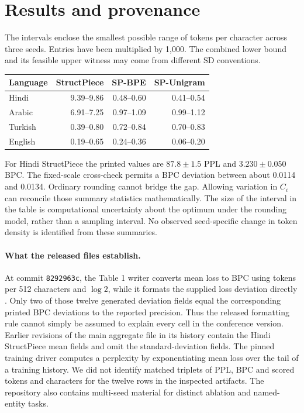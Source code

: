 \documentclass[11pt]{article}
\begin{document}
\newpage
\section{Results and provenance}
The intervals enclose the smallest possible range of tokens per character across three seeds. Entries have been multiplied by 1,000. The combined lower bound and its feasible upper witness may come from different SD conventions.
\begin{center}
\begin{tabular}{lrrr}\toprule
Language & StructPiece & SP-BPE & SP-Unigram\\\midrule
Hindi & 9.39--9.86 & 0.48--0.60 & 0.41--0.54\\
Arabic & 6.91--7.25 & 0.97--1.09 & 0.99--1.12\\
Turkish & 0.39--0.80 & 0.72--0.84 & 0.70--0.83\\
English & 0.19--0.65 & 0.24--0.36 & 0.06--0.20\\
\bottomrule\end{tabular}
\end{center}
For Hindi StructPiece the printed values are $87.8\pm1.5$ PPL and $3.230\pm0.050$ BPC. The fixed-scale cross-check permits a BPC deviation between about 0.0114 and 0.0134. Ordinary rounding cannot bridge the gap. Allowing variation in $C_i$ can reconcile those summary statistics mathematically. The size of the interval in the table is computational uncertainty about the optimum under the rounding model, rather than a sampling interval. No observed seed-specific change in token density is identified from these summaries.

\paragraph{What the released files establish.}
At commit \texttt{8292963c}, the Table 1 writer converts mean loss to BPC using tokens per 512 characters and $\log2$, while it formats the supplied loss deviation directly \cite{code}. Only two of those twelve generated deviation fields equal the corresponding printed BPC deviations to the reported precision. Thus the released formatting rule cannot simply be assumed to explain every cell in the conference version. Earlier revisions of the main aggregate file in its history contain the Hindi StructPiece mean fields and omit the standard-deviation fields. The pinned training driver computes a perplexity by exponentiating mean loss over the tail of a training history. We did not identify matched triplets of PPL, BPC and scored tokens and characters for the twelve rows in the inspected artifacts. The repository also contains multi-seed material for distinct ablation and named-entity tasks.
\end{document}

